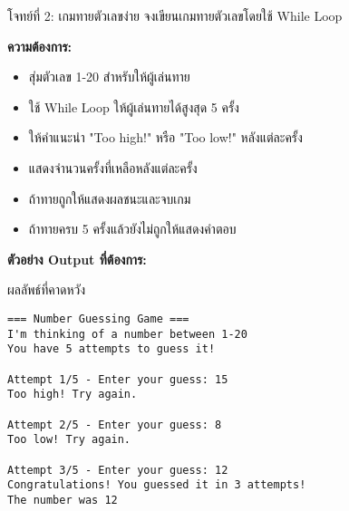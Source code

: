 \documentclass[12pt,a4paper]{article}
\newcommand{\textlight}[1]{{\thailightfont #1}}
\begin{document}
\begin{exercisebox}{โจทย์ที่ 2: เกมทายตัวเลขง่าย}
\textlight{จงเขียนเกมทายตัวเลขโดยใช้ While Loop}

\textlight{\textbf{ความต้องการ:}}
\begin{itemize}
    \item \textlight{สุ่มตัวเลข 1-20 สำหรับให้ผู้เล่นทาย}
    \item \textlight{ใช้ While Loop ให้ผู้เล่นทายได้สูงสุด 5 ครั้ง}
    \item \textlight{ให้คำแนะนำ "Too high!" หรือ "Too low!" หลังแต่ละครั้ง}
    \item \textlight{แสดงจำนวนครั้งที่เหลือหลังแต่ละครั้ง}
    \item \textlight{ถ้าทายถูกให้แสดงผลชนะและจบเกม}
    \item \textlight{ถ้าทายครบ 5 ครั้งแล้วยังไม่ถูกให้แสดงคำตอบ}
\end{itemize}

\textlight{\textbf{ตัวอย่าง Output ที่ต้องการ:}}
\begin{codebox}{ผลลัพธ์ที่คาดหวัง}
\begin{lstlisting}[style=python]
=== Number Guessing Game ===
I'm thinking of a number between 1-20
You have 5 attempts to guess it!

Attempt 1/5 - Enter your guess: 15
Too high! Try again.

Attempt 2/5 - Enter your guess: 8
Too low! Try again.

Attempt 3/5 - Enter your guess: 12
Congratulations! You guessed it in 3 attempts!
The number was 12
\end{lstlisting}
\end{codebox}

\end{exercisebox}
\end{document}
